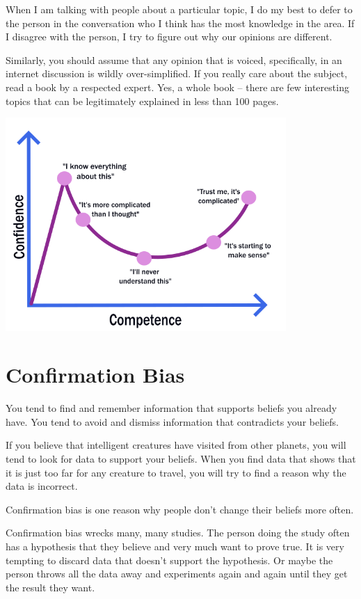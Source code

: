 When I am talking with people about a particular topic, I do my best
to defer to the person in the conversation who I think has the most
knowledge in the area. If I disagree with the person, I try to figure
out why our opinions are different.

Similarly, you should assume that any opinion that is voiced, specifically, in an
internet discussion is wildly over-simplified. If you really care
about the subject, read a book by a respected expert. Yes, a whole
book -- there are few interesting topics that can be legitimately
explained in less than 100 pages.

\includegraphics[width=0.8\textwidth]{bias_DK.png}

\section{Confirmation Bias}

You tend to find and remember information that supports
beliefs you already have. You tend to avoid and dismiss information
that contradicts your beliefs.

If you believe that intelligent creatures have visited from other
planets, you will tend to look for data to support your beliefs. When
you find data that shows that it is just too far for any creature to
travel, you will try to find a reason why the data is incorrect.

Confirmation bias is one reason why people don't change their beliefs
more often.

Confirmation bias wrecks many, many studies. The person doing the
study often has a hypothesis that they believe and very much want to
prove true. It is very tempting to discard data that doesn't support
the hypothesis. Or maybe the person throws all the data away and experiments again and again until they get the result they want.

